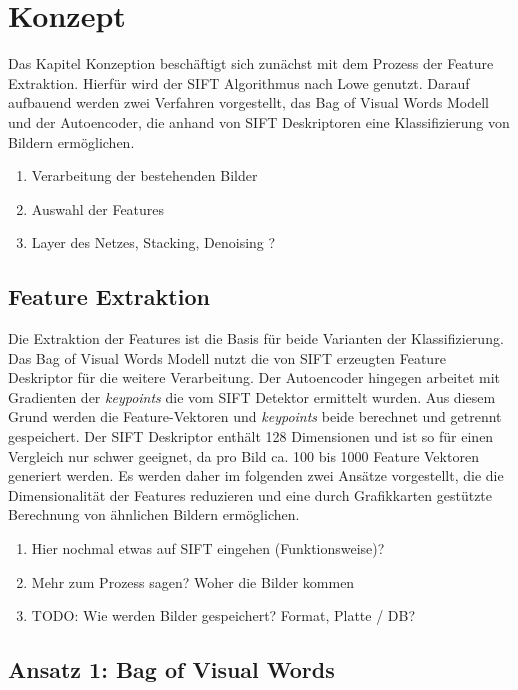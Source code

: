 \chapter{Konzept}

Das Kapitel Konzeption beschäftigt sich zunächst mit dem Prozess der Feature Extraktion. Hierfür wird der SIFT Algorithmus nach Lowe genutzt. Darauf aufbauend werden zwei Verfahren vorgestellt, das Bag of Visual Words Modell und der Autoencoder, die anhand von SIFT Deskriptoren eine Klassifizierung von Bildern ermöglichen.

\begin{enumerate}
	\item Verarbeitung der bestehenden Bilder
	\item Auswahl der Features
	\item Layer des Netzes, Stacking, Denoising ?	
\end{enumerate}

\section{Feature Extraktion}

Die Extraktion der Features ist die Basis für beide Varianten der Klassifizierung. Das Bag of Visual Words Modell nutzt die von SIFT erzeugten Feature Deskriptor für die weitere Verarbeitung. Der Autoencoder hingegen arbeitet mit Gradienten der \textit{keypoints} die vom SIFT Detektor ermittelt wurden. Aus diesem Grund werden die Feature-Vektoren und \textit{keypoints} beide berechnet und getrennt gespeichert.
Der SIFT Deskriptor enthält 128 Dimensionen und ist so für einen Vergleich nur schwer geeignet, da pro Bild ca. 100 bis 1000 Feature Vektoren generiert werden. Es werden daher im folgenden zwei Ansätze vorgestellt, die die Dimensionalität der Features reduzieren und eine durch Grafikkarten gestützte Berechnung von ähnlichen Bildern ermöglichen.

\begin{enumerate}
	\item Hier nochmal etwas auf SIFT eingehen (Funktionsweise)?
	\item Mehr zum Prozess sagen? Woher die Bilder kommen
	\item TODO: Wie werden Bilder gespeichert? Format, Platte / DB?
\end{enumerate}

\section{Ansatz 1: Bag of Visual Words}

